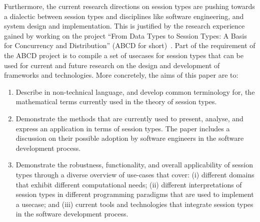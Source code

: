 Furthermore, the current research directions on session types are
pushing towards a dialectic between session types and disciplines
like software engineering, and system design and implementation.
This is justified by the research experience gained by working
on the project
``From Data Types to Session Types: A Basis for Concurrency and Distribution''
(ABCD for short)~\cite{ABCD}.
Part of the requirement of the ABCD project is to compile a set of usecases
for session types that can be used for current and future research on
the design and development of frameworks and technologies.
%
More concretely, the aims of this paper are to:
%
\begin{enumerate}
	\item	Describe in non-technical language, and develop common terminology
			for, the mathematical terms currently used in the theory of
			session types.

	\item	Demonstrate the methods that are currently used to present,
			analyse, and express an application in terms of session types.
			The paper includes a discussion on their possible adoption by
			software engineers in the software development process.


	\item	Demonstrate the robustness, functionality, and overall applicability
			of session types through a diverse overview of use-cases that cover:
			(i) different domains that exhibit different computational needs;
			(ii) different interpretations of session types in different
			programming paradigms that are used to implement a usecase; and
			(iii) current tools and technologies that integrate session types
			in the software development process.
%
%
%
%


\end{enumerate}
